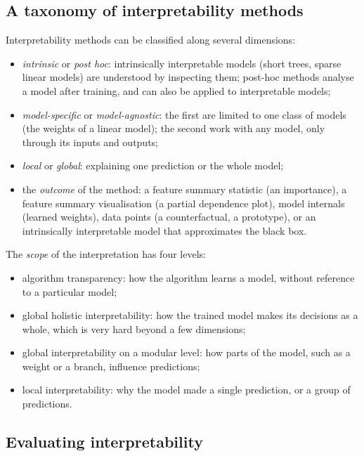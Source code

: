 \subsection{A taxonomy of interpretability methods}

Interpretability methods can be classified along several dimensions:
\begin{itemize}
  \item \emph{intrinsic} or \emph{post hoc}: intrinsically interpretable models (short trees,
        sparse linear models) are understood by inspecting them; post-hoc methods analyse a model
        after training, and can also be applied to interpretable models;
  \item \emph{model-specific} or \emph{model-agnostic}: the first are limited to one class of
        models (the weights of a linear model); the second work with any model, only through its
        inputs and outputs;
  \item \emph{local} or \emph{global}: explaining one prediction or the whole model;
  \item the \emph{outcome} of the method: a feature summary statistic (an importance), a feature
        summary visualisation (a partial dependence plot), model internals (learned weights), data
        points (a counterfactual, a prototype), or an intrinsically interpretable model that
        approximates the black box.
\end{itemize}
The \emph{scope} of the interpretation has four levels:
\begin{itemize}
\item algorithm transparency: how the algorithm learns
a model, without reference to a particular model;
\item global holistic interpretability: how
the trained model makes its decisions as a whole, which is very hard beyond a few dimensions;
\item global
interpretability on a modular level: how parts of the model, such as a weight or a branch,
influence predictions;
\item local interpretability: why the model made a single prediction, or a group of
predictions.
\end{itemize}

\subsection{Evaluating interpretability}

